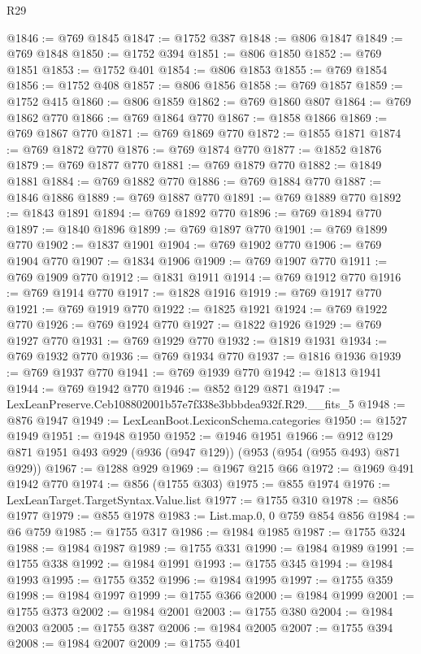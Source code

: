 \begin{lexlean}{R29}
\begin{coremodule}
@1846 := @769 @1845
@1847 := @1752 @387
@1848 := @806 @1847
@1849 := @769 @1848
@1850 := @1752 @394
@1851 := @806 @1850
@1852 := @769 @1851
@1853 := @1752 @401
@1854 := @806 @1853
@1855 := @769 @1854
@1856 := @1752 @408
@1857 := @806 @1856
@1858 := @769 @1857
@1859 := @1752 @415
@1860 := @806 @1859
@1862 := @769 @1860 @807
@1864 := @769 @1862 @770
@1866 := @769 @1864 @770
@1867 := @1858 @1866
@1869 := @769 @1867 @770
@1871 := @769 @1869 @770
@1872 := @1855 @1871
@1874 := @769 @1872 @770
@1876 := @769 @1874 @770
@1877 := @1852 @1876
@1879 := @769 @1877 @770
@1881 := @769 @1879 @770
@1882 := @1849 @1881
@1884 := @769 @1882 @770
@1886 := @769 @1884 @770
@1887 := @1846 @1886
@1889 := @769 @1887 @770
@1891 := @769 @1889 @770
@1892 := @1843 @1891
@1894 := @769 @1892 @770
@1896 := @769 @1894 @770
@1897 := @1840 @1896
@1899 := @769 @1897 @770
@1901 := @769 @1899 @770
@1902 := @1837 @1901
@1904 := @769 @1902 @770
@1906 := @769 @1904 @770
@1907 := @1834 @1906
@1909 := @769 @1907 @770
@1911 := @769 @1909 @770
@1912 := @1831 @1911
@1914 := @769 @1912 @770
@1916 := @769 @1914 @770
@1917 := @1828 @1916
@1919 := @769 @1917 @770
@1921 := @769 @1919 @770
@1922 := @1825 @1921
@1924 := @769 @1922 @770
@1926 := @769 @1924 @770
@1927 := @1822 @1926
@1929 := @769 @1927 @770
@1931 := @769 @1929 @770
@1932 := @1819 @1931
@1934 := @769 @1932 @770
@1936 := @769 @1934 @770
@1937 := @1816 @1936
@1939 := @769 @1937 @770
@1941 := @769 @1939 @770
@1942 := @1813 @1941
@1944 := @769 @1942 @770
@1946 := @852 @129 @871
@1947 := LexLeanPreserve.Ceb108802001b57e7f338e3bbbdea932f.R29.__fits_5
@1948 := @876 @1947
@1949 := LexLeanBoot.LexiconSchema.categories
@1950 := @1527 @1949
@1951 := @1948 @1950
@1952 := @1946 @1951
@1966 := @912 @129 @871 @1951 @493 @929 (@936 (@947 @129)) (@953 (@954 (@955 @493) @871 @929))
@1967 := @1288 @929
@1969 := @1967 @215 @66
@1972 := @1969 @491 @1942 @770
@1974 := @856 (@1755 @303)
@1975 := @855 @1974
@1976 := LexLeanTarget.TargetSyntax.Value.list
@1977 := @1755 @310
@1978 := @856 @1977
@1979 := @855 @1978
@1983 := List.map.{0, 0} @759 @854 @856
@1984 := @6 @759
@1985 := @1755 @317
@1986 := @1984 @1985
@1987 := @1755 @324
@1988 := @1984 @1987
@1989 := @1755 @331
@1990 := @1984 @1989
@1991 := @1755 @338
@1992 := @1984 @1991
@1993 := @1755 @345
@1994 := @1984 @1993
@1995 := @1755 @352
@1996 := @1984 @1995
@1997 := @1755 @359
@1998 := @1984 @1997
@1999 := @1755 @366
@2000 := @1984 @1999
@2001 := @1755 @373
@2002 := @1984 @2001
@2003 := @1755 @380
@2004 := @1984 @2003
@2005 := @1755 @387
@2006 := @1984 @2005
@2007 := @1755 @394
@2008 := @1984 @2007
@2009 := @1755 @401

\end{coremodule}
\end{lexlean}
